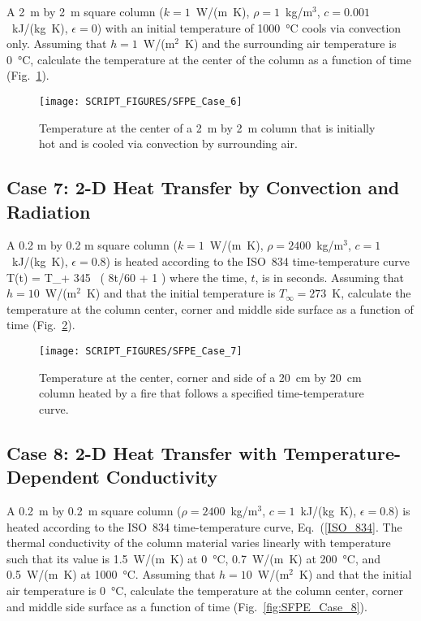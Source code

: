 \documentclass[11pt]{book}
\begin{document}
A 2~m by 2~m square column ($k=1$~W/(m~K), $\rho=1$~kg/m$^3$, $c=0.001$~kJ/(kg~K), $\epsilon=0$) with an initial temperature of 1000~°C cools via convection only. Assuming that $h=1$~W/(m$^2$~K) and the surrounding air temperature is 0~°C, calculate the temperature at the center of the column as a function of time (Fig.~\ref{fig:SFPE_Case_6}).

\begin{figure}[ht]
\centering
\texttt{[image: SCRIPT\_FIGURES/SFPE\_Case\_6]}
\caption[The SFPE heat transfer verification Case 6]{Temperature at the center of a 2~m by 2~m column that is initially hot and is cooled via convection by surrounding air.}
\label{fig:SFPE_Case_6}
\end{figure}

\FloatBarrier

\subsection{Case 7: 2-D Heat Transfer by Convection and Radiation}
\label{SFPE_Case_7}

A 0.2 m by 0.2 m square column ($k=1$~W/(m~K), $\rho=2400$~kg/m$^3$, $c=1$~kJ/(kg~K), $\epsilon=0.8$) is heated according to the ISO~834 time-temperature curve
\be
   T(t) = T_\infty + 345 \, \ln \left( 8t/60 + 1 \right) \label{ISO_834}
\ee
where the time, $t$, is in seconds. Assuming that $h=10$~W/(m$^2$~K) and that the initial temperature is $T_\infty=273$~K, calculate the temperature at the column center, corner and middle side surface as a function of time (Fig.~\ref{fig:SFPE_Case_7}).

\begin{figure}[ht]
\centering
\texttt{[image: SCRIPT\_FIGURES/SFPE\_Case\_7]}
\caption[The SFPE heat transfer verification Case 7]{Temperature at the center, corner and side of a 20~cm by 20~cm column heated by a fire that follows a specified time-temperature curve.}
\label{fig:SFPE_Case_7}
\end{figure}

\FloatBarrier


\subsection{Case 8: 2-D Heat Transfer with Temperature-Dependent Conductivity}
\label{SFPE_Case_8}

A 0.2~m by 0.2~m square column ($\rho=2400$~kg/m$^3$, $c=1$~kJ/(kg~K), $\epsilon=0.8$) is heated according to the ISO~834 time-temperature curve, Eq.~(\ref{ISO_834}. The thermal conductivity of the column material varies linearly with temperature such that its value is 1.5~W/(m~K) at 0~°C, 0.7~W/(m~K) at 200~°C, and 0.5~W/(m~K) at 1000~°C. Assuming that $h=10$~W/(m$^2$~K) and that the initial air temperature is 0~°C, calculate the temperature at the column center, corner and middle side surface as a function of time (Fig.~\ref{fig:SFPE_Case_8}).
\end{document}
